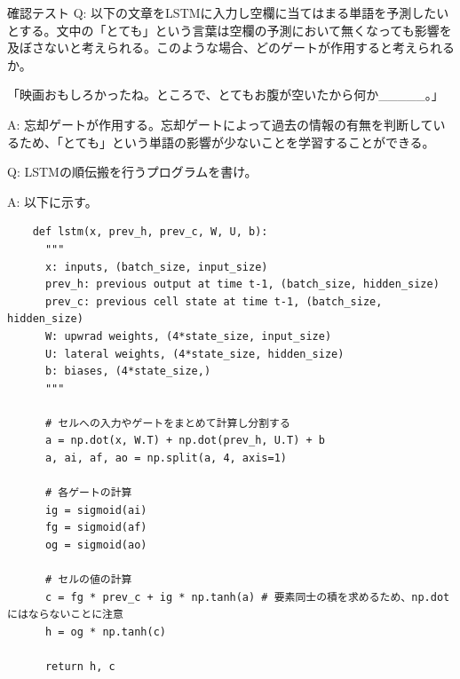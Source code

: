 \documentclass{ltjsarticle}
\begin{document}
\begin{itembox}[l]{確認テスト}
  Q: 以下の文章をLSTMに入力し空欄に当てはまる単語を予測したいとする。文中の「とても」という言葉は空欄の予測において無くなっても影響を及ぼさないと考えられる。このような場合、どのゲートが作用すると考えられるか。
  \par
  「映画おもしろかったね。ところで、とてもお腹が空いたから何か\_\_\_\_\_。」

  A: 忘却ゲートが作用する。忘却ゲートによって過去の情報の有無を判断しているため、「とても」という単語の影響が少ないことを学習することができる。

  Q: LSTMの順伝搬を行うプログラムを書け。

  A: 以下に示す。
  \begin{verbatim}
    def lstm(x, prev_h, prev_c, W, U, b):
      """
      x: inputs, (batch_size, input_size)
      prev_h: previous output at time t-1, (batch_size, hidden_size)
      prev_c: previous cell state at time t-1, (batch_size, hidden_size)
      W: upwrad weights, (4*state_size, input_size)
      U: lateral weights, (4*state_size, hidden_size)
      b: biases, (4*state_size,)
      """

      # セルへの入力やゲートをまとめて計算し分割する
      a = np.dot(x, W.T) + np.dot(prev_h, U.T) + b
      a, ai, af, ao = np.split(a, 4, axis=1)

      # 各ゲートの計算
      ig = sigmoid(ai)
      fg = sigmoid(af)
      og = sigmoid(ao)

      # セルの値の計算
      c = fg * prev_c + ig * np.tanh(a) # 要素同士の積を求めるため、np.dotにはならないことに注意
      h = og * np.tanh(c)

      return h, c
  \end{verbatim}
\end{itembox}

\newpage
\end{document}
